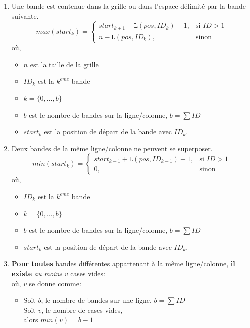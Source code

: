 \documentclass[a4paper,12pt]{report}
\begin{document}
\begin{enumerate}
\item Une bande est contenue dans la grille ou dans l'espace délimité par la bande suivante.
	$$max(start_k) =
	\begin{cases} 
		 start_{k+1}-\mathtt{L}(pos,ID_k)-1, &\text{si } ID > 1\\
		 n - \mathtt{L}(pos,ID_k), & \text{sinon}
	\end{cases}
	$$
	où,
		\begin{itemize}
		\item[] $n$ est la taille de la grille
		\item[] $ID_k$ est la $k^{eme}$ bande
		\item[] $k=\{0,...,b\}$
		\item[] $b$ est le nombre de bandes sur la ligne/colonne, $b=\sum ID$		
		\item[] $start_k$ est la position de départ de la bande avec $ID_k$.
		\end{itemize}
\item Deux bandes de la même ligne/colonne ne peuvent se superposer.
$$ min(start_k) = 
	\begin{cases} 
		start_{k-1}+\mathtt{L}(pos,ID_{k-1})+1, &\text{si } ID > 1 \\
		0, & \text{sinon} 
	\end{cases}
$$
où,
		\begin{itemize}
		\item[] $ID_k$ est la $k^{eme}$ bande
		\item[] $k=\{0,...,b\}$
		\item[] $b$ est le nombre de bandes sur la ligne/colonne, $b=\sum ID$	
		\item[] $start_k$ est la position de départ de la bande avec $ID_k$.
		\end{itemize}
		
	
\item \textbf{Pour toutes} bandes différentes appartenant à la même ligne/colonne, \textbf{il existe} \textit{au moins} $v$ cases vides:\\
où, $v$ se donne comme:
	\begin{itemize}
		\item[]	Soit $b$, le nombre de bandes sur une ligne, $b=\sum ID$\\
		Soit $v$, le nombre de cases vides,\\
		alors $min(v )= b-1$\\
	\end{itemize}


\end{enumerate}
\end{document}
